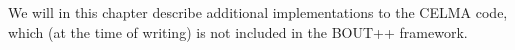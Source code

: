We will in this chapter describe additional implementations to the CELMA code, which (at the time of writing) is not included in the BOUT++ framework.
